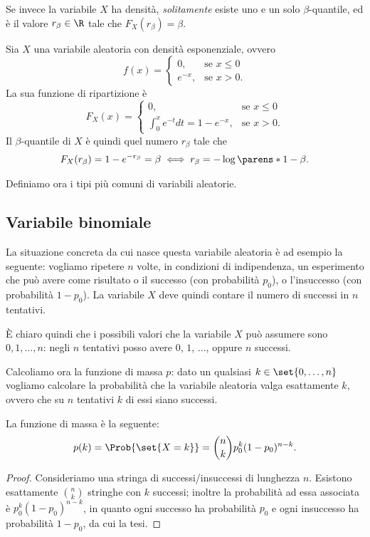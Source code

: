 Se invece la variabile $X$ ha densità, \emph{solitamente} esiste uno e un solo $\beta$-quantile, ed è il valore $r_\beta \in \R$ tale che $F_X(r_\beta) = \beta$.

\begin{example}
    Sia $X$ una variabile aleatoria con densità esponenziale, ovvero \[
        f(x) = \begin{cases}
            0, &\text{se } x \leq 0\\
            e^{-x}, &\text{se } x > 0.
        \end{cases}    
    \] La sua funzione di ripartizione è \[
        F_X(x) = \begin{cases}
            0, &\text{se } x \leq 0\\
            \int_0^x e^{-t}dt = 1 - e^{-x}, &\text{se } x > 0.
        \end{cases}    
    \] Il $\beta$-quantile di $X$ è quindi quel numero $r_\beta$ tale che \begin{align*}
        F_X(r_\beta) = 1 - e^{-r_\beta} = \beta \iff r_\beta = -\log\parens*{1 - \beta}.
    \end{align*} 
\end{example}

Definiamo ora i tipi più comuni di variabili aleatorie.

\subsection{Variabile binomiale}
La situazione concreta da cui nasce questa variabile aleatoria è ad esempio la seguente: vogliamo ripetere $n$ volte, in condizioni di indipendenza, un esperimento che può avere come risultato o il successo (con probabilità $p_0$), o l'insuccesso (con probabilità $1 - p_0$).
La variabile $X$ deve quindi contare il numero di successi in $n$ tentativi.

È chiaro quindi che i possibili valori che la variabile $X$ può assumere sono $0, 1, \dots, n$: negli $n$ tentativi posso avere $0$, $1$, $\dots$, oppure $n$ successi.

Calcoliamo ora la funzione di massa $p$: dato un qualsiasi $k \in \set{0, \dots, n}$ vogliamo calcolare la probabilità che la variabile aleatoria valga esattamente $k$, ovvero che su $n$ tentativi $k$ di essi siano successi.

La funzione di massa è la seguente: \[
    p(k) = \Prob{\set{X = k}} = \binom{n}{k}p_0^k(1-p_0)^{n-k}.
\] 
\begin{proof}
    Consideriamo una stringa di successi/insuccessi di lunghezza $n$. Esistono esattamente $\binom{n}{k}$ stringhe con $k$ successi; inoltre la probabilità ad essa associata è $p_0^k(1-p_0)^{n-k}$, in quanto ogni successo ha probabilità $p_0$ e ogni insuccesso ha probabilità $1-p_0$, da cui la tesi.
\end{proof}

